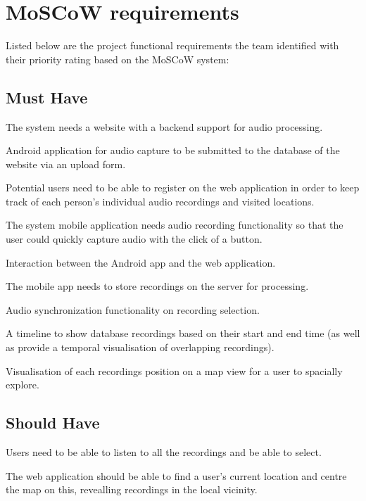 \documentclass{l3proj}
\begin{document}
\section{MoSCoW requirements}
Listed below are the project functional requirements the team identified with their priority rating based on the MoSCoW system:

\subsection{Must Have}
	 The system needs a website with a backend support for audio processing.

	 Android application for audio capture to be submitted to the database of the website via an upload form.

	 Potential users need to be able to register on the web application in order to keep track of each person's individual audio recordings and visited locations.

	 The system mobile application needs audio recording functionality so that the user could quickly capture audio with the click of a button.

	 Interaction between the Android app and the web application.

	 The mobile app needs to store recordings on the server for processing.

	 Audio synchronization functionality on recording selection.

	 A timeline to show database recordings based on their start and end time (as well as provide a temporal visualisation of overlapping recordings).

	 Visualisation of each recordings position on a map view for a user to spacially explore.

\subsection{Should Have}
	 Users need to be able to listen to all the recordings and be able to select.

	 The web application should be able to find a user's current location and centre the map on this, revealling recordings in the local vicinity.
\end{document}
